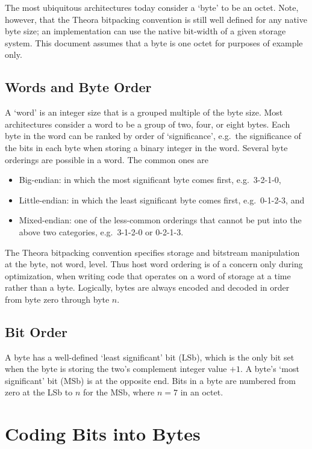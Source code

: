 \documentclass[9pt,letterpaper]{book}
\numberwithin{equation}{chapter}
\numberwithin{figure}{chapter}
\numberwithin{table}{chapter}
\begin{document}
The most ubiquitous architectures today consider a `byte' to be an octet.
Note, however, that the Theora bitpacking convention is still well defined for
 any native byte size; an implementation can use the native bit-width of a
 given storage system.
This document assumes that a byte is one octet for purposes of example only.

\subsection{Words and Byte Order}

A `word' is an integer size that is a grouped multiple of the byte size.
Most architectures consider a word to be a group of two, four, or eight bytes.
Each byte in the word can be ranked by order of `significance', e.g.\ the
 significance of the bits in each byte when storing a binary integer in the
 word.
Several byte orderings are possible in a word.
The common ones are
\begin{itemize}
\item{Big-endian:}
in which the most significant byte comes first, e.g.\ 3-2-1-0,
\item{Little-endian:}
in which the least significant byte comes first, e.g.\ 0-1-2-3, and
\item{Mixed-endian:}
one of the less-common orderings that cannot be put into the above two
 categories, e.g.\ 3-1-2-0 or 0-2-1-3.
\end{itemize}

The Theora bitpacking convention specifies storage and bitstream manipulation
 at the byte, not word, level.
Thus host word ordering is of a concern only during optimization, when writing
 code that operates on a word of storage at a time rather than a byte.
Logically, bytes are always encoded and decoded in order from byte zero through
 byte $n$.

\subsection{Bit Order}

A byte has a well-defined `least significant' bit (LSb), which is the only bit
 set when the byte is storing the two's complement integer value $+1$.
A byte's `most significant' bit (MSb) is at the opposite end.
Bits in a byte are numbered from zero at the LSb to $n$ for the MSb, where
 $n=7$ in an octet.

\section{Coding Bits into Bytes}
\end{document}
